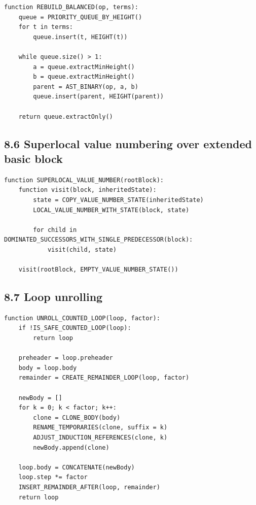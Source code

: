 \documentclass[10pt,letterpaper]{article}
\begin{document}
\begin{verbatim}
function REBUILD_BALANCED(op, terms):
    queue = PRIORITY_QUEUE_BY_HEIGHT()
    for t in terms:
        queue.insert(t, HEIGHT(t))

    while queue.size() > 1:
        a = queue.extractMinHeight()
        b = queue.extractMinHeight()
        parent = AST_BINARY(op, a, b)
        queue.insert(parent, HEIGHT(parent))

    return queue.extractOnly()
\end{verbatim}

\subsection*{8.6 Superlocal value numbering over extended basic block}
{}

\begin{verbatim}
function SUPERLOCAL_VALUE_NUMBER(rootBlock):
    function visit(block, inheritedState):
        state = COPY_VALUE_NUMBER_STATE(inheritedState)
        LOCAL_VALUE_NUMBER_WITH_STATE(block, state)

        for child in DOMINATED_SUCCESSORS_WITH_SINGLE_PREDECESSOR(block):
            visit(child, state)

    visit(rootBlock, EMPTY_VALUE_NUMBER_STATE())
\end{verbatim}

\subsection*{8.7 Loop unrolling}
{}

\begin{verbatim}
function UNROLL_COUNTED_LOOP(loop, factor):
    if !IS_SAFE_COUNTED_LOOP(loop):
        return loop

    preheader = loop.preheader
    body = loop.body
    remainder = CREATE_REMAINDER_LOOP(loop, factor)

    newBody = []
    for k = 0; k < factor; k++:
        clone = CLONE_BODY(body)
        RENAME_TEMPORARIES(clone, suffix = k)
        ADJUST_INDUCTION_REFERENCES(clone, k)
        newBody.append(clone)

    loop.body = CONCATENATE(newBody)
    loop.step *= factor
    INSERT_REMAINDER_AFTER(loop, remainder)
    return loop
\end{verbatim}
\end{document}
